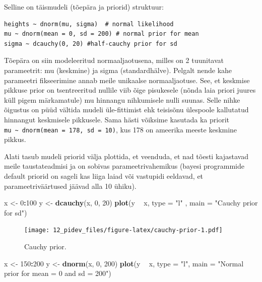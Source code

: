 \documentclass[]{book}
\newenvironment{Shaded}{\begin{snugshade}}{\end{snugshade}}
\newcommand{\KeywordTok}[1]{\textcolor[rgb]{0.13,0.29,0.53}{\textbf{#1}}}
\newcommand{\DataTypeTok}[1]{\textcolor[rgb]{0.13,0.29,0.53}{#1}}
\newcommand{\DecValTok}[1]{\textcolor[rgb]{0.00,0.00,0.81}{#1}}
\newcommand{\StringTok}[1]{\textcolor[rgb]{0.31,0.60,0.02}{#1}}
\newcommand{\OperatorTok}[1]{\textcolor[rgb]{0.81,0.36,0.00}{\textbf{#1}}}
\newcommand{\NormalTok}[1]{#1}
\begin{document}
Selline on täismudeli (tõepära ja priorid) struktuur:

\begin{verbatim}
heights ~ dnorm(mu, sigma)  # normal likelihood
mu ~ dnorm(mean = 0, sd = 200) # normal prior for mean
sigma ~ dcauchy(0, 20) #half-cauchy prior for sd 
\end{verbatim}

Tõepära on siin modeleeritud normaaljaotusena, milles on 2 tuunitavat
parameetrit: mu (keskmine) ja sigma (standardhälve). Pelgalt nende kahe
parameetri fikseerimine annab meile unikaalse normaaljaotuse. See, et
keskmise pikkuse prior on tsentreeritud nullile viib õige pisukesele
(nõnda laia priori juures küll pigem märkamatule) mu hinnangu
nihkumisele nulli suunas. Selle nihke õigustus on püüd vältida mudeli
üle-fittimist ehk teisisõnu ülespoole kallutatud hinnangut keskmisele
pikkusele. Sama hästi võiksime kasutada ka priorit
\texttt{mu\ \textasciitilde{}\ dnorm(mean\ =\ 178,\ sd\ =\ 10)}, kus 178
on ameerika meeste keskmine pikkus.

Alati tasub mudeli priorid välja plottida, et veenduda, et nad tõesti
kajastavad meile taustateadmisi ja on sobivas parameetrivahemikus
(bayesi programmide default priorid on sageli kas liiga laiad või
vastupidi eeldavad, et parameetriväärtused jäävad alla 10 ühiku).



\begin{Shaded}
\begin{Highlighting}[]
\NormalTok{x <-}\StringTok{ }\DecValTok{0}\OperatorTok{:}\DecValTok{100}
\NormalTok{y <-}\StringTok{ }\KeywordTok{dcauchy}\NormalTok{(x, }\DecValTok{0}\NormalTok{, }\DecValTok{20}\NormalTok{)}
\KeywordTok{plot}\NormalTok{(y }\OperatorTok{~}\StringTok{ }\NormalTok{x, }\DataTypeTok{type =} \StringTok{"l"}\NormalTok{ , }\DataTypeTok{main =} \StringTok{"Cauchy prior for sd"}\NormalTok{)}
\end{Highlighting}
\end{Shaded}

\begin{figure}
\centering
\texttt{[image: 12\_pidev\_files/figure-latex/cauchy-prior-1.pdf]}
\caption{\label{fig:cauchy-prior}Cauchy prior.}
\end{figure}



\begin{Shaded}
\begin{Highlighting}[]
\NormalTok{x <-}\StringTok{ }\DecValTok{150}\OperatorTok{:}\DecValTok{200}
\NormalTok{y <-}\StringTok{ }\KeywordTok{dnorm}\NormalTok{(x, }\DecValTok{0}\NormalTok{, }\DecValTok{200}\NormalTok{)}
\KeywordTok{plot}\NormalTok{(y }\OperatorTok{~}\StringTok{ }\NormalTok{x, }\DataTypeTok{type =} \StringTok{"l"}\NormalTok{, }\DataTypeTok{main =} \StringTok{"Normal prior for mean = 0 and sd = 200"}\NormalTok{)}
\end{Highlighting}
\end{Shaded}
\end{document}
